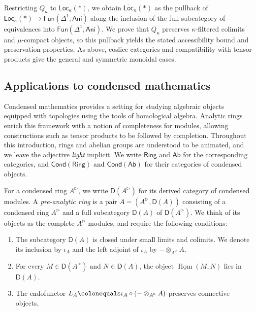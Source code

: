 Restricting $Q_\kappa$ to $\mathsf{Loc}_\kappa(\ast)$, we obtain $\overline{\mathsf{Loc}}_\kappa(\ast)$ as the pullback of $\mathsf{Loc}_{\kappa}(\ast)\to\mathsf{Fun}(\Delta^{1},\mathsf{Ani})$ along the inclusion of the full subcategory of equivalences into $\mathsf{Fun}(\Delta^{1},\mathsf{Ani})$. We prove that $Q_\kappa$ preserves $\kappa$-filtered colimits and $\mu$-compact objects, so this pullback yields the stated accessibility bound and preservation properties. As above, coslice categories and compatibility with tensor products give the general and symmetric monoidal cases.

\subsection*{Applications to condensed mathematics}

Condensed mathematics provides a setting for studying algebraic objects equipped with topologies using the tools of homological algebra. Analytic rings enrich this framework with a notion of completeness for modules, allowing constructions such as tensor products to be followed by completion. Throughout this introduction, rings and abelian groups are understood to be animated, and we leave the adjective \emph{light} implicit. We write $\mathsf{Ring}$ and $\mathsf{Ab}$ for the corresponding categories, and $\mathsf{Cond}(\mathsf{Ring})$ and $\mathsf{Cond}(\mathsf{Ab})$ for their categories of condensed objects.

For a condensed ring $A^\triangleright$, we write $\mathsf{D}(A^\triangleright)$ for its derived category of condensed modules. A \emph{pre-analytic ring} is a pair $A=(A^\triangleright,\mathsf{D}(A))$ consisting of a condensed ring $A^\triangleright$ and a full subcategory $\mathsf{D}(A)$ of $\mathsf{D}(A^\triangleright)$. We think of its objects as the complete $A^\triangleright$-modules, and require the following conditions:
\begin{enumerate}[label=(\roman*)]
    \item The subcategory $\mathsf{D}(A)$ is closed under small limits and colimits. We denote its inclusion by $\iota_A$ and the left adjoint of $\iota_A$ by $-\otimes_{A^\triangleright}A$.
    \item For every $M\in\mathsf{D}(A^\triangleright)$ and $N\in\mathsf{D}(A)$, the object $\underline{\operatorname{Hom}}(M,N)$ lies in $\mathsf{D}(A)$.
    \item The endofunctor $L_A\colonequals\iota_A\circ(-\otimes_{A^\triangleright}A)$ preserves connective objects.
\end{enumerate}


